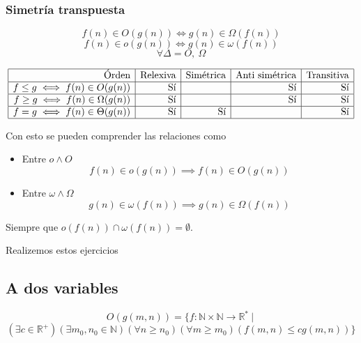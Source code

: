 \documentclass[tikz,11pt,fleqn]{book} %
\begin{document}
\subsubsection{Simetría transpuesta}
$$
f(n)\in O(g(n))
    \iff
g(n)\in\Omega(f(n))
$$ $$
f(n)\in o(g(n))
    \iff
g(n)\in\omega(f(n)) $$ $$
\forall\Delta= O,~\Omega
$$
\begin{theorem}
    $$\begin{array} {|r|r|r|r|r|}
        \hline \text{Órden} & \text{Relexiva} & \text{Simétrica} & \text{Anti simétrica} & \text{Transitiva} \\
        \hline f\le g\iff f(n)\in O(g(n)) & \text{Sí} & & \text{Sí} & \text{Sí} \\
        \hline f\ge g\iff f(n)\in \Omega(g(n)) & \text{Sí} & & \text{Sí} & \text{Sí} \\
        \hline f= g\iff f(n)\in \Theta(g(n)) & \text{Sí} & \text{Sí} & & \text{Sí} \\
        \hline
    \end{array}$$

    Con esto se pueden comprender las relaciones como
    \begin{itemize}
        \item Entre $o\land O$
            $$  f(n)\in o(g(n)) \implies f(n)\in O(g(n))  $$
        \item Entre $\omega\land\Omega$
            $$  g(n)\in \omega(f(n)) \implies g(n)\in \Omega(f(n))  $$
    \end{itemize}
    Siempre que $o(f(n))\cap \omega(f(n))=\emptyset$.
\end{theorem}

\begin{example}
    Realizemos estos ejercicios
\end{example}

\subsection{A dos variables}
\begin{definition}
    $$O(g(m,n))=\{f:\mathbb N\times \mathbb N\to \mathbb R^*~|~
    $$ $$
    (\exists c\in \mathbb R^+)
    (\exists  m_0 , n_0 \in \mathbb N)
    (\forall  n\ge  n_0)
    (\forall  m\ge  m_0)
    (f(m, n) \le  c g(m, n))
    \}
    $$
\end{definition}
\end{document}
